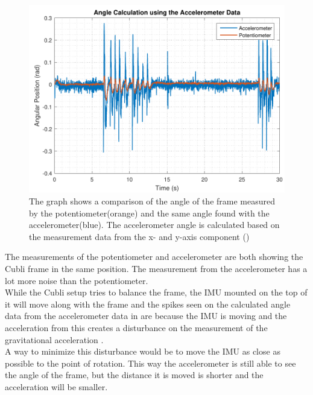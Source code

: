 \begin{figure}[H]
	\centering
	\includegraphics[scale=0.65]{figures/angleAcc}
	\caption{The graph shows a comparison of the angle of the frame measured by the potentiometer(orange) and the same angle found with the accelerometer(blue). The accelerometer angle is calculated based on the measurement data from the x- and y-axis component ()}
	\label{angleAcc}
\end{figure}\vspace{-5mm}
%
The measurements of the potentiometer and accelerometer are both showing the Cubli frame in the same position. The measurement from the accelerometer has a lot more noise than the potentiometer.\\
While the Cubli setup tries to balance the frame, the IMU mounted on the top of it will move along with the frame and the spikes seen on the calculated angle data from the accelerometer data in  are because the IMU is moving and the acceleration from this creates a disturbance on the measurement of the gravitational acceleration \cite{JWarren}.\\
A way to minimize this disturbance would be to move the IMU as close as possible to the point of rotation. This way the accelerometer is still able to see the angle of the frame, but the distance it is moved is shorter and the acceleration will be smaller. 

